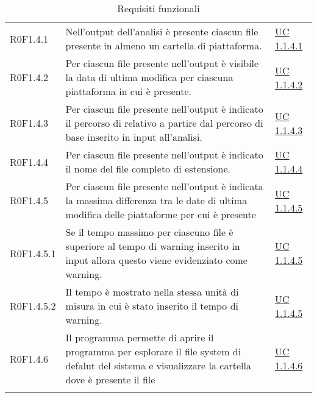 \begin{center}
\begin{longtable}{p{4.2cm}!{\color{white}\vrule width 0.5mm}p{6cm}!{\color{white}\vrule width 0.5mm}p{2.5cm}!{\color{white}\vrule width 0.5mm}}
				\hspace{4mm}\hypertarget{R0F1.4.1}{R0F1.4.1} & Nell'output dell'analisi è presente ciascun file presente in almeno un cartella di piattaforma. & \hyperref[subsec:UC1.1.4.1]{UC 1.1.4.1}\\
				
				\hspace{4mm}\hypertarget{R0F1.4.2}{R0F1.4.2} & Per ciascun file presente nell'output è visibile la data di ultima modifica per ciascuna piattaforma in cui è presente. & \hyperref[subsec:UC1.1.4.2]{UC 1.1.4.2}\\
				
				\hspace{4mm}\hypertarget{R0F1.4.3}{R0F1.4.3} & Per ciascun file presente nell'output è indicato il percorso di relativo a partire dal percorso di base inserito in input all'analisi. & \hyperref[subsec:UC1.1.4.3]{UC 1.1.4.3}\\
				
				\hspace{4mm}\hypertarget{R0F1.4.4}{R0F1.4.4} & Per ciascun file presente nell'output è indicato il nome del file completo di estensione. & \hyperref[subsec:UC1.1.4.4]{UC 1.1.4.4}\\
				
				\hspace{4mm}\hypertarget{R0F1.4.5}{R0F1.4.5} & Per ciascun file presente nell'output è indicata la massima differenza tra le date di ultima modifica delle piattaforme per cui è presente & \hyperref[subsec:UC1.1.4.5]{UC 1.1.4.5}\\
				
				\hspace{6mm}\hypertarget{R0F1.4.5.1}{R0F1.4.5.1} & Se il tempo massimo per ciascuno file è superiore al tempo di warning inserito in input allora questo viene evidenziato come warning. & \hyperref[subsec:UC1.1.4.5]{UC 1.1.4.5}\\
				
				\hspace{6mm}\hypertarget{R0F1.4.5.2}{R0F1.4.5.2} & Il tempo è mostrato nella stessa unità di misura in cui è stato inserito il tempo di warning. & \hyperref[subsec:UC1.1.4.5]{UC 1.1.4.5}\\
				
				\hspace{4mm}\hypertarget{R0F1.4.6}{R0F1.4.6} & Il programma permette di aprire il programma per esplorare il file system di defalut del sistema e visualizzare la cartella dove è presente il file & \hyperref[subsec:UC1.1.4.6]{UC 1.1.4.6}\\
				
				\hline
				\caption{Requisiti funzionali}
			\end{longtable}
		\end{center}

